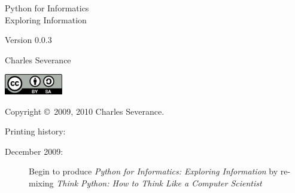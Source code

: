 \documentclass[10pt]{book}
\newcommand{\theversion}{0.0.3}
\begin{document}
\begin{latexonly}





\blankpage
\blankpage

\pagebreak
\thispagestyle{empty}

\begin{flushright}
\vspace*{2.0in}

\begin{spacing}{3}
{\huge Python for Informatics}\\
{\Large Exploring Information}
\end{spacing}

\vspace{0.25in}

Version \theversion

\vspace{0.5in}


{\Large
Charles Severance\\
}


\vspace{2.5in}

\centerline{\includegraphics[width=1in]{figs2/by-sa.eps}}
\vfill

\end{flushright}


\pagebreak
\thispagestyle{empty}

{\small
Copyright \copyright ~2009, 2010 Charles Severance.


Printing history:

\begin{description}

\item[December 2009:] Begin to 
produce 
{\em Python for Informatics: Exploring Information}
by re-mixing
{\em Think Python: How to Think Like
a Computer Scientist}


\end{description}}
\end{latexonly}
\end{document}
